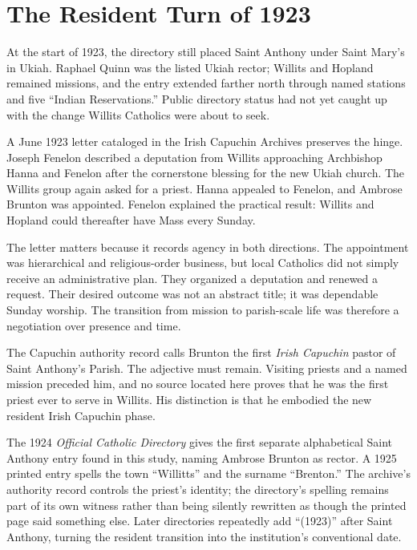 \section{The Resident Turn of 1923}

At the start of 1923, the directory still placed Saint Anthony under Saint Mary's in Ukiah. Raphael Quinn was the listed Ukiah rector; Willits and Hopland remained missions, and the entry extended farther north through named stations and five ``Indian Reservations.'' Public directory status had not yet caught up with the change Willits Catholics were about to seek.

A June 1923 letter cataloged in the Irish Capuchin Archives preserves the hinge. Joseph Fenelon described a deputation from Willits approaching Archbishop Hanna and Fenelon after the cornerstone blessing for the new Ukiah church. The Willits group again asked for a priest. Hanna appealed to Fenelon, and Ambrose Brunton was appointed. Fenelon explained the practical result: Willits and Hopland could thereafter have Mass every Sunday.

The letter matters because it records agency in both directions. The appointment was hierarchical and religious-order business, but local Catholics did not simply receive an administrative plan. They organized a deputation and renewed a request. Their desired outcome was not an abstract title; it was dependable Sunday worship. The transition from mission to parish-scale life was therefore a negotiation over presence and time.

The Capuchin authority record calls Brunton the first \emph{Irish Capuchin} pastor of Saint Anthony's Parish. The adjective must remain. Visiting priests and a named mission preceded him, and no source located here proves that he was the first priest ever to serve in Willits. His distinction is that he embodied the new resident Irish Capuchin phase.

The 1924 \emph{Official Catholic Directory} gives the first separate alphabetical Saint Anthony entry found in this study, naming Ambrose Brunton as rector. A 1925 printed entry spells the town ``Willitts'' and the surname ``Brenton.'' The archive's authority record controls the priest's identity; the directory's spelling remains part of its own witness rather than being silently rewritten as though the printed page said something else. Later directories repeatedly add ``(1923)'' after Saint Anthony, turning the resident transition into the institution's conventional date.

